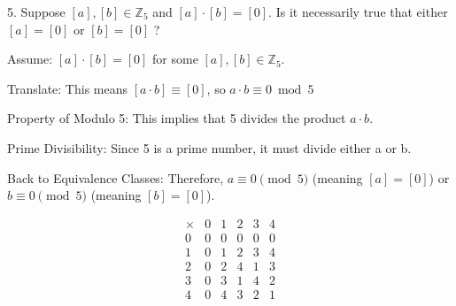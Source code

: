 \documentclass{article}
\begin{document}
\begin{exercise}{}{}
	{5. Suppose $[a],[b] \in \mathbb{Z}_5$ and $[a] \cdot[b]=[0]$. Is it
		necessarily true that either $[a]=[0]$ or $[b]=[0]$ ?}
	\begin{alist}
		\item Assume: $[a]\cdot[b]=[0]$ for some $[a],[b]\in\mathbb{Z}_5$.
		\item Translate: This means $[a\cdot b]\equiv[0]$, so $a\cdot b\equiv 0\bmod 5$
		\item Property of Modulo 5: This implies that 5 divides the product $a\cdot b$.
		\item Prime Divisibility: Since 5 is a prime number, it must divide either a or b.
		\item Back to Equivalence Classes: Therefore, $a \equiv 0 \pmod 5$ (meaning
		$[a]=[0]$) or $b \equiv 0 \pmod 5$ (meaning $[b]=[0]$).
		\item \[
			\begin{array}{c|ccccc}
				\times & 0 & 1 & 2 & 3 & 4 \\
				\hline
				0      & 0 & 0 & 0 & 0 & 0 \\
				1      & 0 & 1 & 2 & 3 & 4 \\
				2      & 0 & 2 & 4 & 1 & 3 \\
				3      & 0 & 3 & 1 & 4 & 2 \\
				4      & 0 & 4 & 3 & 2 & 1 \\
			\end{array}
		\]
	\end{alist}
\end{exercise}{}{}
\end{document}
